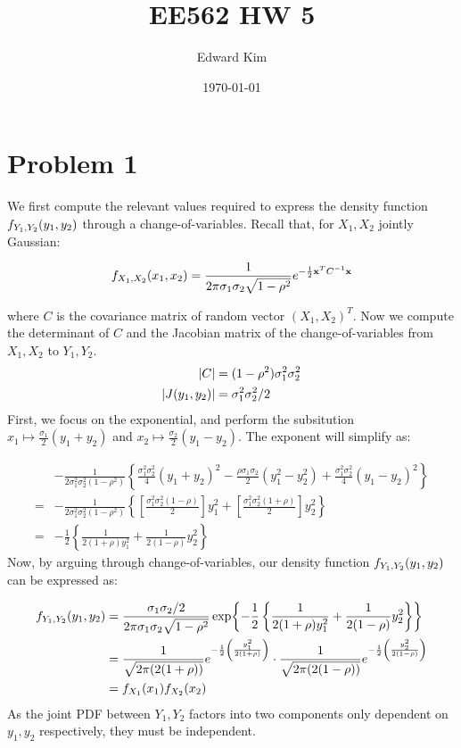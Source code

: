 \documentclass[12pt]{article}%
\title{EE562 HW 5}
\author{Edward Kim}
\date{\today}
\begin{document}
\maketitle

\section{Problem 1}
We first compute the relevant values required to express the density function $\jointPDF{Y_1}{Y_2}$ through a change-of-variables. Recall that, for $X_1,X_2$ jointly Gaussian:

\[\jointPDF{X_1}{X_2} = \frac{1}{2\pi\sigma_1\sigma_2\sqrt{1-\rho^2}} e^{-\frac{1}{2}{\bold x}^T C^{-1} {\bold x}} \]

where $C$ is the covariance matrix of random vector $(X_1,X_2)^T$. Now we compute the determinant of $C$ and the Jacobian matrix of the change-of-variables from $X_1,X_2$ to $Y_1,Y_2$.
%
\begin{align*}
  \abs{C} & = (1 - \rho^2)\sigma_1^2\sigma_2^2 \\
   \abs{J(y_1,y_2)} & = \sigma_1^2\sigma_2^2/2
\end{align*}
First, we focus on the exponential, and perform the subsitution $x_1 \mapsto \frac{\sigma_1}{2}(y_1 + y_2)$ and $x_2 \mapsto \frac{\sigma_2}{2}(y_1 - y_2)$. The exponent will simplify as:

\begin{align*}
  &-\frac{1}{2\sigma_1^2\sigma_2^2(1 - \rho^2)} \left\{\frac{\sigma_1^2\sigma_2^2}{4}(y_1 + y_2)^2 - \frac{\rho\sigma_1\sigma_2}{2}(y_1^2 - y_2^2) + \frac{\sigma_1^2\sigma_2^2}{4}(y_1 - y_2)^2\right\} \\
   = &-\frac{1}{2\sigma_1^2\sigma_2^2(1 - \rho^2)} \left\{ \left[\frac{\sigma_1^2\sigma_2^2(1-\rho)}{2}\right]y_1^2 + \left[\frac{\sigma_1^2\sigma_2^2(1+\rho)}{2}\right]y_2^2 \right\}\\
   = &-\frac{1}{2}\left\{\frac{1}{2(1+\rho)y_1^2} + \frac{1}{2(1-\rho)}y_2^2\right\}
\end{align*}
%
Now, by arguing through change-of-variables, our density function $\jointPDF{Y_1}{Y_2}$ can be expressed as:

\begin{align*}
  \jointPDF{Y_1}{Y_2} & = \frac{\sigma_1\sigma_2/2}{2\pi\sigma_1\sigma_2\sqrt{1 - \rho^2}} \exp{-\frac{1}{2}\left\{\frac{1}{2(1+\rho)y_1^2} + \frac{1}{2(1-\rho)}y_2^2\right\}} \\
  & = \frac{1}{\sqrt{2\pi(2(1 + \rho))}}e^{-\frac{1}{2}\left(\frac{y_1^2}{2(1+\rho)}\right)}\cdot \frac{1}{\sqrt{2\pi(2(1 - \rho))}}e^{-\frac{1}{2}\left(\frac{y_2^2}{2(1-\rho)}\right)} \\
  & = \PDF{X_1}\PDF{X_2}
\end{align*}
%
As the joint PDF between $Y_1,Y_2$ factors into two components only dependent on $y_1,y_2$ respectively, they must be independent.
\end{document}
